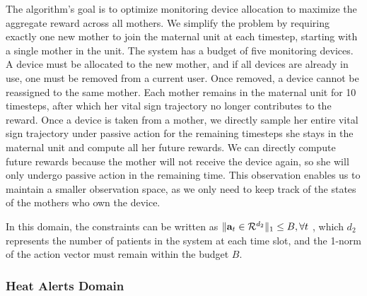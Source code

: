 The algorithm's goal is to optimize monitoring device allocation to maximize the aggregate reward across all mothers. We simplify the problem by requiring exactly one new mother to join the maternal unit at each timestep, starting with a single mother in the unit. The system has a budget of five monitoring devices. A device must be allocated to the new mother, and if all devices are already in use, one must be removed from a current user. Once removed, a device cannot be reassigned to the same mother. Each mother remains in the maternal unit for 10 timesteps, after which her vital sign trajectory no longer contributes to the reward. Once a device is taken from a mother, we directly sample her entire vital sign trajectory under passive action for the remaining timesteps she stays in the maternal unit and compute all her future rewards. We can directly compute future rewards because the mother will not receive the device again, so she will only undergo passive action in the remaining time. This observation enables us to maintain a smaller observation space, as we only need to keep track of the states of the mothers who own the device. 



In this domain, the constraints can be written as  $\|{\mathbf{a}}_t\in\mathcal{R}^{d_2}\|_1\leq B, \forall t$ , which $d_2$ represents the number of patients in the system at each time slot, and the 1-norm of the action vector must remain within the budget $B$.









\subsubsection{Heat Alerts Domain}\label{appdx:heat-alerts}






